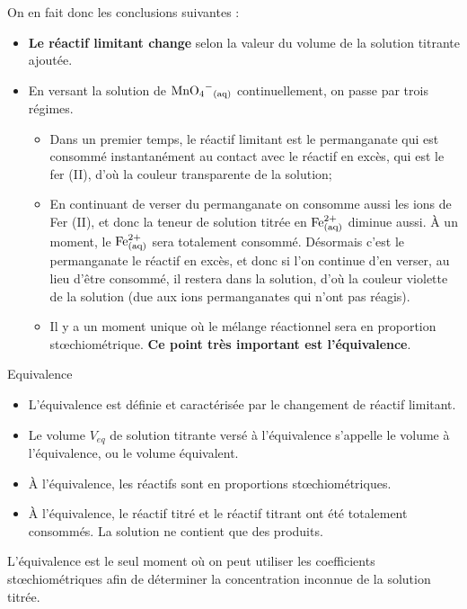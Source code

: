 \documentclass[11pt,a4paper]{article}
\begin{document}
On en fait donc les conclusions suivantes :

\begin{itemize}
    \item \textbf{Le réactif limitant change} selon la valeur du volume de la solution titrante ajoutée. 
    \item En versant la solution de $\ce{MnO4^{-}_{(aq)}}$ continuellement, on passe par trois régimes.  
    \begin{itemize}
        \item Dans un premier temps, le réactif limitant est le permanganate qui est consommé instantanément au contact avec le réactif en excès, qui est le fer (II), d’où la couleur transparente de la solution;
        \item En continuant de verser du permanganate on consomme aussi les ions de Fer (II), et donc la teneur de solution titrée en $\ce{Fe^{2+}_{(aq)}}$ diminue aussi.  À un moment, le $\ce{Fe^{2+}_{(aq)}}$  sera totalement consommé.  Désormais c’est le permanganate le réactif en excès, et donc si l’on continue d’en verser, au lieu d’être consommé, il restera dans la solution, d’où la couleur violette de la solution (due aux ions permanganates qui n’ont pas réagis).  
        \item Il y a un moment unique où le mélange réactionnel sera en proportion stœchiométrique. \textbf{Ce point très important est l’équivalence}. 
    \end{itemize}
\end{itemize}

\begin{defn}{Equivalence}
\begin{itemize}
    \item L’équivalence est définie et caractérisée par le changement de réactif limitant.
    \item Le volume $V_{eq}$  de solution titrante versé à l’équivalence s’appelle le volume à l’équivalence, ou le volume équivalent.
    \item À l’équivalence, les réactifs sont en proportions stœchiométriques.
    \item À l’équivalence, le réactif titré et le réactif titrant ont été totalement consommés.  La solution ne contient que des produits. 
\end{itemize}
\end{defn}

L’équivalence est le seul moment où on peut utiliser les coefficients stœchiométriques afin de déterminer la concentration inconnue de la solution titrée.  
\end{document}
